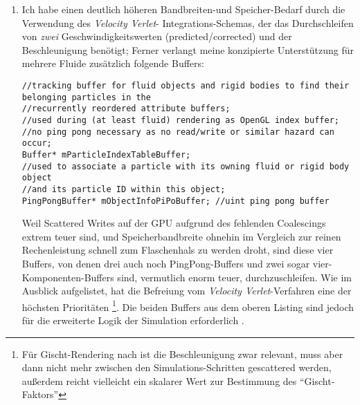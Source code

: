 \begin{enumerate}
		
		\item Ich habe einen deutlich höheren Bandbreiten-und Speicher-Bedarf durch die Verwendung des 
		\emph{Velocity Verlet}- Integrations-Schemas, der das Durchschleifen von \emph{zwei} Geschwindigkeitswerten
		(predicted/corrected) und der Beschleunigung benötigt; Ferner verlangt meine konzipierte
		Unterstützung für mehrere Fluide zusätzlich folgende  Buffers:
		\begin{lstlisting}
//tracking buffer for fluid objects and rigid bodies to find their belonging particles in the
//recurrently reordered attribute buffers;
//used during (at least fluid) rendering as OpenGL index buffer;
//no ping pong necessary as no read/write or similar hazard can occur;
Buffer* mParticleIndexTableBuffer;
//used to associate a particle with its owning fluid or rigid body object
//and its particle ID within this object;
PingPongBuffer* mObjectInfoPiPoBuffer; //uint ping pong buffer	
		\end{lstlisting}
		Weil Scattered Writes auf der GPU aufgrund des fehlenden Coalescings extrem teuer sind,
		und Speicherbandbreite ohnehin im Vergleich zur reinen Rechenleistung schnell zum Flaschenhals
		zu werden droht, sind diese vier Buffers, von denen drei auch noch PingPong-Buffers und zwei
		sogar vier-Komponenten-Buffers sind, vermutlich enorm teuer, durchzuschleifen. Wie im Ausblick
		aufgelistet, hat die Befreiung vom \emph{Velocity Verlet}-Verfahren eine der höchsten 
		Prioritäten \footnote{Für Gischt-Rendering nach \cite{Green2009FluidRenderingCurvatureFlow} ist die 
		Beschleunigung zwar relevant, muss aber dann nicht mehr zwischen den Simulations-Schritten gescattered
		werden, außerdem reicht vielleicht ein skalarer Wert zur Bestimmung des "`Gischt-Faktors"'}.
		Die beiden Buffers aus dem oberen Listing sind jedoch für die erweiterte Logik der Simulation erforderlich .
		

\end{enumerate}
